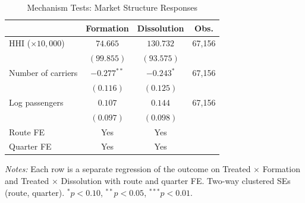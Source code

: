 \begin{table}[H]
\centering
\caption{Mechanism Tests: Market Structure Responses}
\label{tab:mechanisms}
\begin{threeparttable}
\begin{tabular}{lccc}
\toprule
 & Formation & Dissolution & Obs. \\
\midrule
HHI ($\times 10{,}000$) & $74.665$ & $130.732$ & 67,156 \\
 & $(99.855)$ & $(93.575)$ & \\
Number of carriers & $-0.277^{**}$ & $-0.243^{*}$ & 67,156 \\
 & $(0.116)$ & $(0.125)$ & \\
Log passengers & $0.107$ & $0.144$ & 67,156 \\
 & $(0.097)$ & $(0.098)$ & \\
\midrule
Route FE & Yes & Yes & \\
Quarter FE & Yes & Yes & \\
\bottomrule
\end{tabular}
\begin{tablenotes}[flushleft]
\small
\item \textit{Notes:} Each row is a separate regression of the outcome on Treated $\times$ Formation and Treated $\times$ Dissolution with route and quarter FE. Two-way clustered SEs (route, quarter). $^{*} p<0.10$, $^{**} p<0.05$, $^{***} p<0.01$.
\end{tablenotes}
\end{threeparttable}
\end{table}

